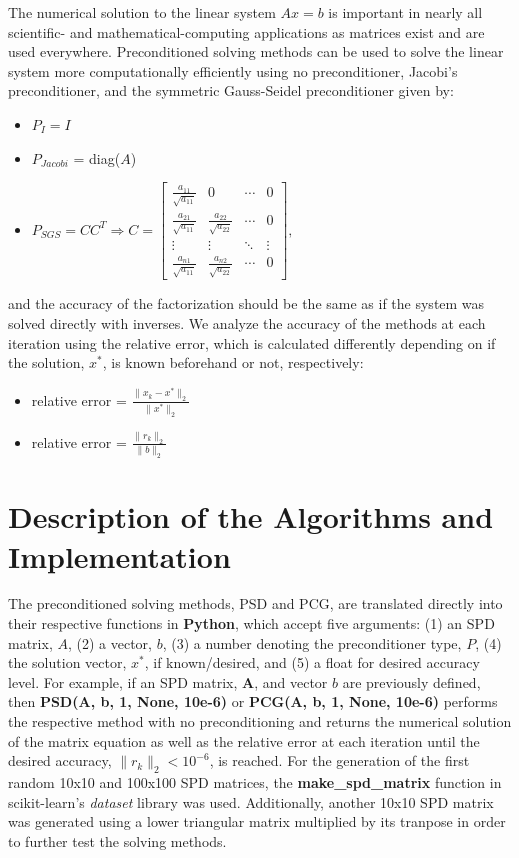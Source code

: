 \documentclass[11pt]{article}
\newcommand{\norm}[1]{\lVert#1\rVert}
\begin{document}
The numerical solution to the linear system $Ax = b$ is important in nearly all scientific- and mathematical-computing applications as matrices exist and are used everywhere. Preconditioned solving methods can be used to solve the linear system more computationally efficiently using no preconditioner, Jacobi's preconditioner, and the symmetric Gauss-Seidel preconditioner given by: 
\begin{itemize}
	\item $P_I = I$
	\item $P_{Jacobi}$ = diag($A$)
	\item $P_{SGS} = CC^T \Rightarrow 
		C = \begin{bmatrix} \frac{a_{11}}{\sqrt{a_{11}}} & 0 				       & \cdots & 0 \\
					 \frac{a_{21}}{\sqrt{a_{11}}} &  \frac{a_{22}}{\sqrt{a_{22}}} & \cdots & 0 \\
					 \vdots 			       & \vdots 			       & \ddots & \vdots \\
				            \frac{a_{n1}}{\sqrt{a_{11}}}&  \frac{a_{n2}}{\sqrt{a_{22}}} & \cdots & 0
		\end{bmatrix},$ 
\end{itemize} 
and the accuracy of the factorization should be the same as if the system was solved directly with inverses. We analyze the accuracy of the methods at each iteration using the relative error, which is calculated differently depending on if the solution, $x^*$, is known beforehand or not, respectively:
\begin{itemize}
	\item relative error = $\frac{\norm{x_k - x^*}_2}{\norm{x^*}_2}$
	\item relative error = $\frac{\norm{r_k}_2}{\norm{b}_2}$

\end{itemize} 

\section{Description of the Algorithms and Implementation}

The preconditioned solving methods, PSD and PCG, are translated directly into their respective functions in \textbf{Python}, which accept five arguments: (1) an SPD matrix, $A$, (2) a vector, $b$, (3) a number denoting the preconditioner type, $P$, (4) the solution vector, $x^*$, if known/desired, and (5) a float for desired accuracy level. For example, if an SPD matrix, \textbf{A}, and vector $b$ are previously defined, then \textbf{PSD(A, b, 1, None, 10e-6)} or \textbf{PCG(A, b, 1, None, 10e-6)} performs the respective method with no preconditioning and returns the numerical solution of the matrix equation as well as the relative error at each iteration until the desired accuracy, $\norm{r_k}_2 < 10^{-6}$, is reached. For the generation of the first random 10x10 and 100x100 SPD matrices, the \textbf{make\_spd\_matrix} function in scikit-learn's \emph{dataset} library was used. Additionally, another 10x10 SPD matrix was generated using a lower triangular matrix multiplied by its tranpose in order to further test the solving methods.
\end{document}
